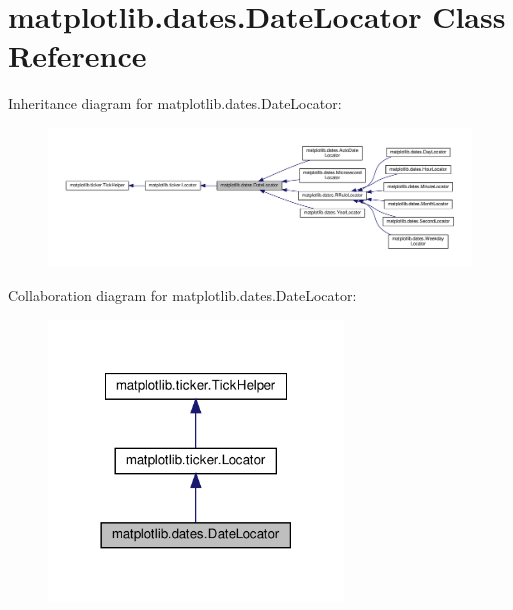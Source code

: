 \hypertarget{classmatplotlib_1_1dates_1_1DateLocator}{}\section{matplotlib.\+dates.\+Date\+Locator Class Reference}
\label{classmatplotlib_1_1dates_1_1DateLocator}


Inheritance diagram for matplotlib.\+dates.\+Date\+Locator\+:
\nopagebreak
\begin{figure}[H]
\begin{center}
\leavevmode
\includegraphics[width=350pt]{classmatplotlib_1_1dates_1_1DateLocator__inherit__graph}
\end{center}
\end{figure}


Collaboration diagram for matplotlib.\+dates.\+Date\+Locator\+:
\nopagebreak
\begin{figure}[H]
\begin{center}
\leavevmode
\includegraphics[width=222pt]{classmatplotlib_1_1dates_1_1DateLocator__coll__graph}
\end{center}
\end{figure}
